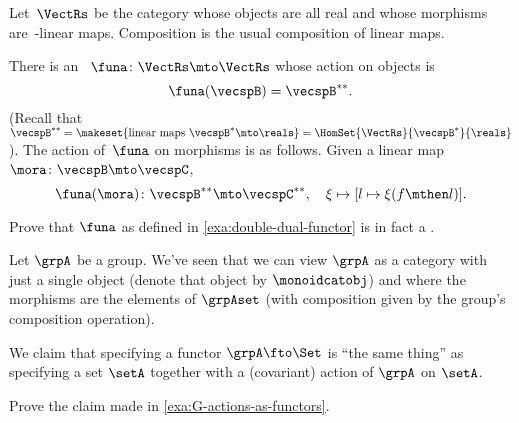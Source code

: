\begin{example}
    \label{exa:double-dual-functor}
    Let~$\VectRs$ be the category whose objects are all real  and whose morphisms are~\reals-linear maps.
    Composition is the usual composition of linear maps.

    There is an ~$\funa \colon \VectRs \mto \VectRs$ whose action on objects is
    \begin{equation}
        \funa ( \vecspB ) = \vecspB^{**}.
    \end{equation}
    (Recall that~$\vecspB^{**} = \makeset{ \text{linear maps } \vecspB^* \mto \reals } =  \HomSet{\VectRs}{\vecspB^*}{\reals}$).
    The action of~$\funa$ on morphisms is as follows.
    Given a linear map~$\mora \colon \vecspB \mto \vecspC$,
    \begin{equation}
        \funa ( \mora ) \colon \vecspB^{**} \mto \vecspC^{**}, \quad \xi \mapsto [ l \mapsto \xi (f \mthen l)].
    \end{equation}
\end{example}

\begin{gradedexercise}
    \label{ex:DoubleDualFunctor}
    Prove that $\funa$ as defined in \cref{exa:double-dual-functor} is in fact a .
\end{gradedexercise}

\begin{example}\label{exa:G-actions-as-functors}
    Let $\grpA$ be a group.
    We've seen that we can view $\grpA$ as a category with just a single object (denote that object by $\monoidcatobj$) and where the morphisms are the elements of $\grpAset$ (with composition given by the group's composition operation).

    We claim that specifying a functor $\grpA \fto \Set$ is ``the same thing'' as specifying a set $\setA$ together with a (covariant) action of $\grpA$ on $\setA$.
\end{example}

\begin{exercise}
    Prove the claim made in \cref{exa:G-actions-as-functors}.
\end{exercise}
\begin{solution}
\end{solution}

% 

